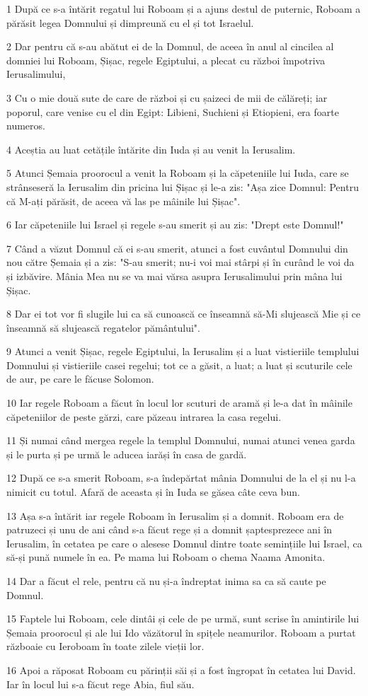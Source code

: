 \par 1 După ce s-a întărit regatul lui Roboam și a ajuns destul de puternic, Roboam a părăsit legea Domnului și dimpreună cu el și tot Israelul.
\par 2 Dar pentru că s-au abătut ei de la Domnul, de aceea în anul al cincilea al domniei lui Roboam, Șișac, regele Egiptului, a plecat cu război împotriva Ierusalimului,
\par 3 Cu o mie două sute de care de război și cu șaizeci de mii de călăreți; iar poporul, care venise cu el din Egipt: Libieni, Suchieni și Etiopieni, era foarte numeros.
\par 4 Aceștia au luat cetățile întărite din Iuda și au venit la Ierusalim.
\par 5 Atunci Șemaia proorocul a venit la Roboam și la căpeteniile lui Iuda, care se strânseseră la Ierusalim din pricina lui Șișac și le-a zis: "Așa zice Domnul: Pentru că M-ați părăsit, de aceea vă las pe mâinile lui Șișac".
\par 6 Iar căpeteniile lui Israel și regele s-au smerit și au zis: "Drept este Domnul!"
\par 7 Când a văzut Domnul că ei s-au smerit, atunci a fost cuvântul Domnului din nou către Șemaia și a zis: "S-au smerit; nu-i voi mai stârpi și în curând le voi da și izbăvire. Mânia Mea nu se va mai vărsa asupra Ierusalimului prin mâna lui Șișac.
\par 8 Dar ei tot vor fi slugile lui ca să cunoască ce înseamnă să-Mi slujească Mie și ce înseamnă să slujească regatelor pământului".
\par 9 Atunci a venit Șișac, regele Egiptului, la Ierusalim și a luat vistieriile templului Domnului și vistieriile casei regelui; tot ce a găsit, a luat; a luat și scuturile cele de aur, pe care le făcuse Solomon.
\par 10 Iar regele Roboam a făcut în locul lor scuturi de aramă și le-a dat în mâinile căpeteniilor de peste gărzi, care păzeau intrarea la casa regelui.
\par 11 Și numai când mergea regele la templul Domnului, numai atunci venea garda și le purta și pe urmă le aducea iarăși în casa de gardă.
\par 12 După ce s-a smerit Roboam, s-a îndepărtat mânia Domnului de la el și nu l-a nimicit cu totul. Afară de aceasta și în Iuda se găsea câte ceva bun.
\par 13 Așa s-a întărit iar regele Roboam în Ierusalim și a domnit. Roboam era de patruzeci și unu de ani când s-a făcut rege și a domnit șaptesprezece ani în Ierusalim, în cetatea pe care o alesese Domnul dintre toate semințiile lui Israel, ca să-și pună numele în ea. Pe mama lui Roboam o chema Naama Amonita.
\par 14 Dar a făcut el rele, pentru că nu și-a îndreptat inima sa ca să caute pe Domnul.
\par 15 Faptele lui Roboam, cele dintâi și cele de pe urmă, sunt scrise în amintirile lui Șemaia proorocul și ale lui Ido văzătorul în spițele neamurilor. Roboam a purtat războaie cu Ieroboam în toate zilele vieții lor.
\par 16 Apoi a răposat Roboam cu părinții săi și a fost îngropat în cetatea lui David. Iar în locul lui s-a făcut rege Abia, fiul său.

